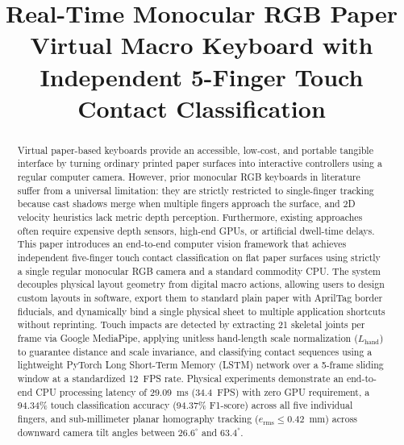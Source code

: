 \documentclass[conference]{IEEEtran}
\begin{document}
\title{Real-Time Monocular RGB Paper Virtual Macro Keyboard with Independent 5-Finger Touch Contact Classification}

\author{
\and
{}
}

\maketitle

\begin{abstract}
Virtual paper-based keyboards provide an accessible, low-cost, and portable tangible interface by turning ordinary printed paper surfaces into interactive controllers using a regular computer camera. However, prior monocular RGB keyboards in literature suffer from a universal limitation: they are strictly restricted to single-finger tracking because cast shadows merge when multiple fingers approach the surface, and 2D velocity heuristics lack metric depth perception. Furthermore, existing approaches often require expensive depth sensors, high-end GPUs, or artificial dwell-time delays. This paper introduces an end-to-end computer vision framework that achieves independent five-finger touch contact classification on flat paper surfaces using strictly a single regular monocular RGB camera and a standard commodity CPU. The system decouples physical layout geometry from digital macro actions, allowing users to design custom layouts in software, export them to standard plain paper with AprilTag border fiducials, and dynamically bind a single physical sheet to multiple application shortcuts without reprinting. Touch impacts are detected by extracting 21 skeletal joints per frame via Google MediaPipe, applying unitless hand-length scale normalization ($L_{\text{hand}}$) to guarantee distance and scale invariance, and classifying contact sequences using a lightweight PyTorch Long Short-Term Memory (LSTM) network over a 5-frame sliding window at a standardized 12~FPS rate. Physical experiments demonstrate an end-to-end CPU processing latency of 29.09~ms (34.4~FPS) with zero GPU requirement, a 94.34\% touch classification accuracy (94.37\% F1-score) across all five individual fingers, and sub-millimeter planar homography tracking ($e_{\text{rms}} \le 0.42$~mm) across downward camera tilt angles between $26.6^\circ$ and $63.4^\circ$.
\end{abstract}
\end{document}
